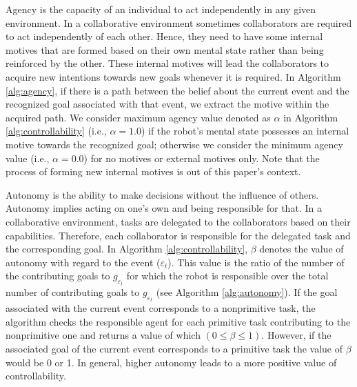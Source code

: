 \documentclass{aamas2016}
\begin{document}
Agency is the capacity of an individual to act independently in any given
environment. In a collaborative environment sometimes collaborators are required
to act independently of each other. Hence, they need to have some internal motives
that are formed based on their own mental state rather than being reinforced by
the other. These internal motives will lead the collaborators to acquire new
intentions towards new goals whenever it is required. In Algorithm
\ref{alg:agency}, if there is a path between the belief about the current event
and the recognized goal associated with that event, we extract the motive within
the acquired path. We consider maximum agency value denoted as $\alpha$ in
Algorithm \ref{alg:controllability} (i.e., $\alpha=1.0$) if the robot's mental
state possesses an internal motive towards the recognized goal; otherwise we
consider the minimum agency value (i.e., $\alpha=0.0$) for no motives or
external motives only. Note that the process of forming new internal motives is
out of this paper's context.

Autonomy is the ability to make decisions without the influence of others.
Autonomy implies acting on one's own and being responsible for that. In a
collaborative environment, tasks are delegated to the collaborators based on
their capabilities. Therefore, each collaborator is responsible for the
delegated task and the corresponding goal. In Algorithm
\ref{alg:controllability}, $\beta$ denotes the value of autonomy with regard to
the event ($\varepsilon_t$). This value is the ratio of the number of the
contributing goals to $\mathit{g}_{\varepsilon_t}$ for which the robot is
responsible over the total number of contributing goals to
$\mathit{g}_{\varepsilon_t}$ (see Algorithm \ref{alg:autonomy}). If the
goal associated with the current event corresponds to a nonprimitive task, the
algorithm checks the responsible agent for each primitive task contributing to
the nonprimitive one and returns a value of which $(0 \leq \beta \leq 1)$.
However, if the associated goal of the current event corresponds to a primitive
task the value of $\beta$ would be 0 or 1. In general, higher autonomy leads to
a more positive value of controllability.

\renewcommand\thealgorithm{4\alph{algorithm}}
\setcounter{algorithm}{1}
\end{document}
